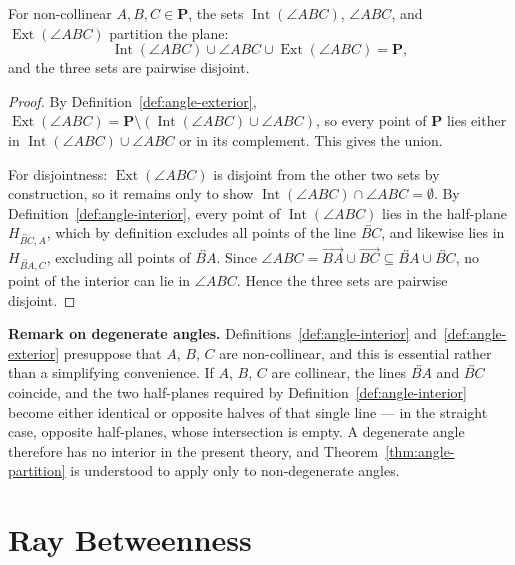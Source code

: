 \documentclass[../../../main/main.tex]{subfiles}
\begin{document}
\begin{theorem}\label{thm:angle-partition}
For non-collinear $A, B, C \in \mathbf{P}$, the sets $\operatorname{Int}(\angle ABC)$, $\angle ABC$, and $\operatorname{Ext}(\angle ABC)$ partition the plane:
\[
\operatorname{Int}(\angle ABC) \cup \angle ABC \cup \operatorname{Ext}(\angle ABC) = \mathbf{P},
\]
and the three sets are pairwise disjoint.
\end{theorem}
\begin{proof}
By Definition~\ref{def:angle-exterior}, $\operatorname{Ext}(\angle ABC) = \mathbf{P} \setminus (\operatorname{Int}(\angle ABC) \cup \angle ABC)$, so every point of $\mathbf{P}$ lies either in $\operatorname{Int}(\angle ABC) \cup \angle ABC$ or in its complement. This gives the union.

For disjointness: $\operatorname{Ext}(\angle ABC)$ is disjoint from the other two sets by construction, so it remains only to show $\operatorname{Int}(\angle ABC) \cap \angle ABC = \emptyset$. By Definition~\ref{def:angle-interior}, every point of $\operatorname{Int}(\angle ABC)$ lies in the half-plane $H_{\overleftrightarrow{BC},A}$, which by definition excludes all points of the line $\overleftrightarrow{BC}$, and likewise lies in $H_{\overleftrightarrow{BA},C}$, excluding all points of $\overleftrightarrow{BA}$. Since $\angle ABC = \overrightarrow{BA} \cup \overrightarrow{BC} \subseteq \overleftrightarrow{BA} \cup \overleftrightarrow{BC}$, no point of the interior can lie in $\angle ABC$. Hence the three sets are pairwise disjoint.
\end{proof}

\medskip
\noindent\textbf{Remark on degenerate angles.} Definitions~\ref{def:angle-interior} and~\ref{def:angle-exterior} presuppose that $A$, $B$, $C$ are non-collinear, and this is essential rather than a simplifying convenience. If $A$, $B$, $C$ are collinear, the lines $\overleftrightarrow{BA}$ and $\overleftrightarrow{BC}$ coincide, and the two half-planes required by Definition~\ref{def:angle-interior} become either identical or opposite halves of that single line --- in the straight case, opposite half-planes, whose intersection is empty. A degenerate angle therefore has no interior in the present theory, and Theorem~\ref{thm:angle-partition} is understood to apply only to non-degenerate angles.

\section{Ray Betweenness}
\end{document}
